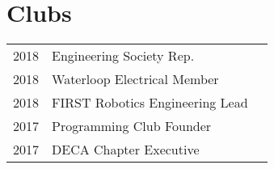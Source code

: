 \documentclass[]{chandan-cv}
\begin{document}
\begin{minipage}[t]{0.33\textwidth}

\section{Clubs} 
\begin{tabular}{rll}
2018		&	Engineering Society Rep.\\
2018		&	Waterloop Electrical Member\\
2018		&	FIRST Robotics Engineering Lead\\
2017		&	Programming Club Founder\\
2017		&	DECA Chapter Executive\\
\end{tabular}
\sectionsep


%
%
%
%
%
%
%

\end{minipage} 
\hfill
\end{document}
